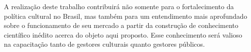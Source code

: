 \documentclass[a4paper, 12pt, openright, oneside, german, french, english, brazil, article]{abntex2}
\begin{document}
A realização deste trabalho contribuirá não somente para o fortalecimento da política cultural no Brasil, mas também para um entendimento mais aprofundado sobre o funcionamento de seu mercado a partir da construção de conhecimento científico inédito acerca do objeto aqui proposto. Esse conhecimento será valioso na capacitação tanto de gestores culturais quanto gestores públicos.















\postextual
{}

\end{document}
